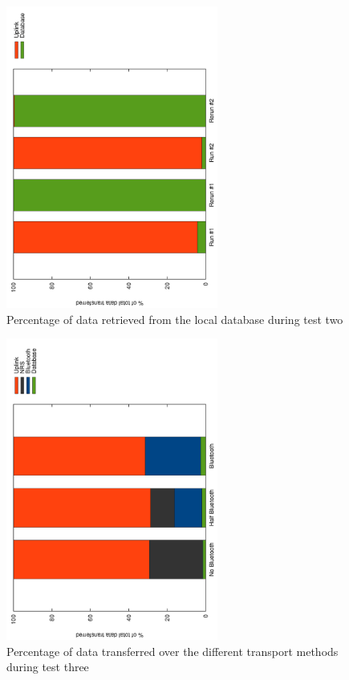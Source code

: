 \begin{figure}[H]
	\centering
		\includegraphics[width=0.62\textwidth, angle=-90]{./img/rerun.pdf}
    	\caption{Percentage of data retrieved from the local database during test two}
	\label{fig:frontendtest2}
\end{figure}

\begin{figure}[H]
	\centering
		\includegraphics[width=0.62\textwidth, angle=-90]{./img/bt.pdf}
    	\caption{Percentage of data transferred over the different transport methods during test three}
	\label{fig:frontendtest3}
\end{figure}

